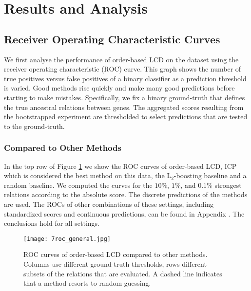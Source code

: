 \newpage
\section{Results and Analysis}
\label{chapter:analysis}





\subsection{Receiver Operating Characteristic Curves}

We first analyse the performance of order-based LCD on the \citet{kemmeren2014large} dataset using the receiver operating characteristic (ROC) curve. This graph shows the number of true positives versus false positives of a binary classifier as a prediction threshold is varied. Good methods rise quickly and make many good predictions before starting to make mistakes. Specifically, we fix a binary ground-truth that defines the true ancestral relations between genes. The aggregated scores resulting from the bootstrapped experiment are thresholded to select predictions that are tested to the ground-truth.

\subsubsection{Compared to Other Methods}

In the top row of Figure \ref{fig:7:rocgen} we show the ROC curves of order-based LCD, ICP which is considered the best method on this data, the L$_2$-boosting baseline and a random baseline. We computed the curves for the $10\%$, $1\%$, and $0.1\%$ strongest relations according to the absolute score. The discrete predictions of the methods are used. The ROCs of other combinations of these settings, including standardized scores and continuous predictions, can be found in Appendix . The conclusions hold for all settings.

\begin{figure}[h]
    \centering
    \texttt{[image: 7roc\_general.jpg]}
    \caption{ROC curves of order-based LCD compared to other methods. Columns use different ground-truth thresholds, rows different subsets of the relations that are evaluated. A dashed line indicates that a method resorts to random guessing.}
    \label{fig:7:rocgen}
\end{figure}

